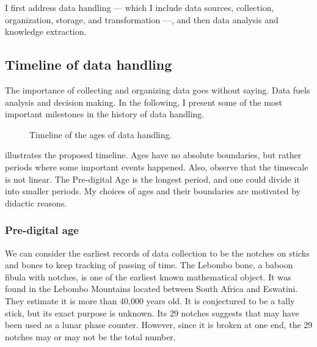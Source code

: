 I first address data handling --- which I include data sources, collection, organization,
storage, and transformation ---, and then data analysis and knowledge extraction.

\subsection{Timeline of data handling}
\label{sub:time-handling}

The importance of collecting and organizing data goes without saying.  Data fuels analysis and
decision making.  In the following, I present some of the most important milestones in the history
of data handling.

\begin{figure}
  \centering
  \caption{Timeline of the ages of data handling.}
  \label{fig:data-handling-history}
\end{figure}

 illustrates the proposed timeline.  Ages have no absolute
boundaries, but rather periods where some important events happened.  Also, observe that
the timescale is not linear.  The Pre-digital Age is the longest period, and one could
divide it into smaller periods.  My choices of ages and their boundaries are motivated by
didactic reasons.

\subsubsection{Pre-digital age}

We can consider the earliest records of data collection to be the notches on sticks and
bones to keep tracking of passing of time.  The Lebombo bone, a baboon fibula with
notches, is one of the earliest known mathematical object.  It was found in the Lebombo
Mountains located between South Africa and Eswatini.
They estimate it is more
than 40,000 years old. It is conjectured to be a tally stick, but its exact purpose is
unknown. Its 29 notches suggests that may have been used as a lunar phase counter.
However, since it is broken at one end, the 29 notches may or may not be the total
number.

